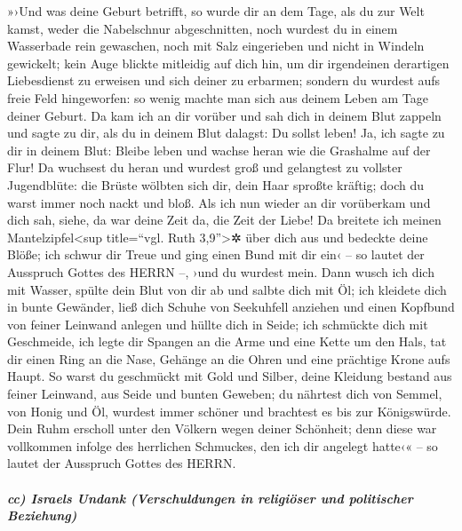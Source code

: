 »›Und was deine Geburt betrifft, so wurde dir an dem Tage,
als du zur Welt kamst, weder die Nabelschnur abgeschnitten, noch wurdest
du in einem Wasserbade rein gewaschen, noch mit Salz eingerieben und
nicht in Windeln gewickelt; kein Auge blickte mitleidig
auf dich hin, um dir irgendeinen derartigen Liebesdienst zu erweisen und
sich deiner zu erbarmen; sondern du wurdest aufs freie Feld hingeworfen:
so wenig machte man sich aus deinem Leben am Tage deiner Geburt.
Da kam ich an dir vorüber und sah dich in deinem Blut
zappeln und sagte zu dir, als du in deinem Blut dalagst: Du sollst
leben! Ja, ich sagte zu dir in deinem Blut: Bleibe leben
und wachse heran wie die Grashalme auf der Flur! Da
wuchsest du heran und wurdest groß und gelangtest zu vollster
Jugendblüte: die Brüste wölbten sich dir, dein Haar sproßte kräftig;
doch du warst immer noch nackt und bloß. Als ich nun
wieder an dir vorüberkam und dich sah, siehe, da war deine Zeit da, die
Zeit der Liebe! Da breitete ich meinen Mantelzipfel\textless sup
title=``vgl. Ruth 3,9''\textgreater✲ über dich aus und bedeckte deine
Blöße; ich schwur dir Treue und ging einen Bund mit dir ein‹ -- so
lautet der Ausspruch Gottes des HERRN --, ›und du wurdest mein.
Dann wusch ich dich mit Wasser, spülte dein Blut von dir
ab und salbte dich mit Öl; ich kleidete dich in bunte
Gewänder, ließ dich Schuhe von Seekuhfell anziehen und einen Kopfbund
von feiner Leinwand anlegen und hüllte dich in Seide; ich
schmückte dich mit Geschmeide, ich legte dir Spangen an die Arme und
eine Kette um den Hals, tat dir einen Ring an die Nase,
Gehänge an die Ohren und eine prächtige Krone aufs Haupt.
So warst du geschmückt mit Gold und Silber, deine
Kleidung bestand aus feiner Leinwand, aus Seide und bunten Geweben; du
nährtest dich von Semmel, von Honig und Öl, wurdest immer schöner und
brachtest es bis zur Königswürde. Dein Ruhm erscholl
unter den Völkern wegen deiner Schönheit; denn diese war vollkommen
infolge des herrlichen Schmuckes, den ich dir angelegt hatte‹« -- so
lautet der Ausspruch Gottes des HERRN.

\hypertarget{cc-israels-undank-verschuldungen-in-religiuxf6ser-und-politischer-beziehung}{%
\subparagraph{cc) Israels Undank (Verschuldungen in religiöser und
politischer
Beziehung)}\label{cc-israels-undank-verschuldungen-in-religiuxf6ser-und-politischer-beziehung}}

